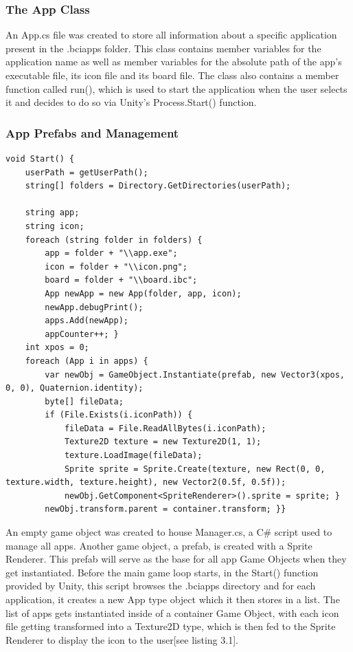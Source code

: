 \subsubsection{The App Class}
An App.cs file was created to store all information about a specific application present in the .bciapps folder. This class contains member variables for the application name as well as member variables for the absolute path of the app's executable file, its icon file and its board file. The class also contains a member function called run(), which is used to start the application when the user selects it and decides to do so via Unity's Process.Start() function.
\subsubsection{App Prefabs and Management}
\begin{lstlisting}[language={[Sharp]C}, caption={Manager.cs initialisation}, label={lst:Manager Init}]
void Start() {
    userPath = getUserPath();
    string[] folders = Directory.GetDirectories(userPath);

    string app;
    string icon;
    foreach (string folder in folders) {
        app = folder + "\\app.exe";
        icon = folder + "\\icon.png";
        board = folder + "\\board.ibc";
        App newApp = new App(folder, app, icon);
        newApp.debugPrint();
        apps.Add(newApp);
        appCounter++; }
    int xpos = 0;
    foreach (App i in apps) {
        var newObj = GameObject.Instantiate(prefab, new Vector3(xpos, 0, 0), Quaternion.identity);
        byte[] fileData;
        if (File.Exists(i.iconPath)) {
            fileData = File.ReadAllBytes(i.iconPath);
            Texture2D texture = new Texture2D(1, 1);
            texture.LoadImage(fileData);
            Sprite sprite = Sprite.Create(texture, new Rect(0, 0, texture.width, texture.height), new Vector2(0.5f, 0.5f));
            newObj.GetComponent<SpriteRenderer>().sprite = sprite; }
        newObj.transform.parent = container.transform; }}
\end{lstlisting}


An empty game object was created to house Manager.cs, a C\# script used to manage all apps. Another game object, a prefab, is created with a Sprite Renderer. This prefab will serve as the base for all app Game Objects when they get instantiated. 
\vspace{\baselineskip}\newline
Before the main game loop starts, in the Start() function provided by Unity, this script browses the .bciapps directory and for each application, it creates a new App type object which it then stores in a list. The list of apps gets instantiated inside of a container Game Object, with each icon file getting transformed into a Texture2D type, which is then fed to the Sprite Renderer to display the icon to the user[see listing 3.1].

